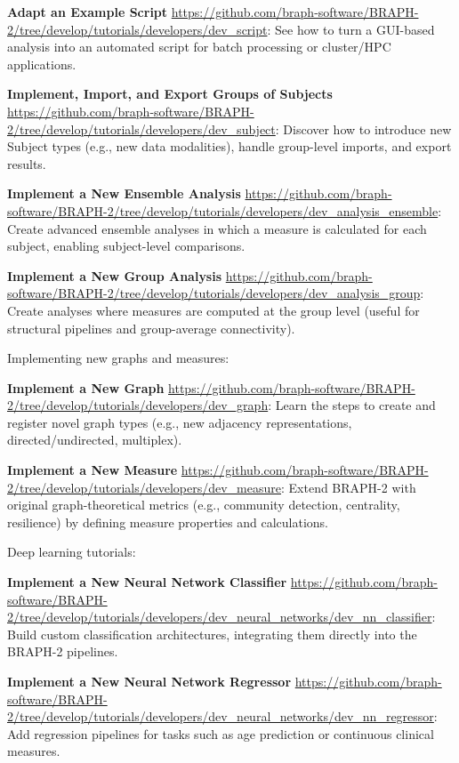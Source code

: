\documentclass[justified]{tufte-handout}
\begin{document}
\textbf{Adapt an Example Script} \url{https://github.com/braph-software/BRAPH-2/tree/develop/tutorials/developers/dev_script}:  
See how to turn a GUI-based analysis into an automated script for batch processing or cluster/HPC applications.

\textbf{Implement, Import, and Export Groups of Subjects} \url{https://github.com/braph-software/BRAPH-2/tree/develop/tutorials/developers/dev_subject}:  
Discover how to introduce new Subject types (e.g., new data modalities), handle group-level imports, and export results.

\textbf{Implement a New Ensemble Analysis} \url{https://github.com/braph-software/BRAPH-2/tree/develop/tutorials/developers/dev_analysis_ensemble}:  
Create advanced ensemble analyses in which a measure is calculated for each subject, enabling subject-level comparisons.

\textbf{Implement a New Group Analysis} \url{https://github.com/braph-software/BRAPH-2/tree/develop/tutorials/developers/dev_analysis_group}:  
Create analyses where measures are computed at the group level (useful for structural pipelines and group-average connectivity).

Implementing new graphs and measures:

\textbf{Implement a New Graph} \url{https://github.com/braph-software/BRAPH-2/tree/develop/tutorials/developers/dev_graph}:  
Learn the steps to create and register novel graph types (e.g., new adjacency representations, directed/undirected, multiplex).

\textbf{Implement a New Measure} \url{https://github.com/braph-software/BRAPH-2/tree/develop/tutorials/developers/dev_measure}:
Extend BRAPH-2 with original graph-theoretical metrics (e.g., community detection, centrality, resilience) by defining measure properties and calculations.

Deep learning tutorials:

\textbf{Implement a New Neural Network Classifier} \url{https://github.com/braph-software/BRAPH-2/tree/develop/tutorials/developers/dev_neural_networks/dev_nn_classifier}:
Build custom classification architectures, integrating them directly into the BRAPH-2 pipelines.

\textbf{Implement a New Neural Network Regressor} \url{https://github.com/braph-software/BRAPH-2/tree/develop/tutorials/developers/dev_neural_networks/dev_nn_regressor}:  
Add regression pipelines for tasks such as age prediction or continuous clinical measures.
\end{document}
